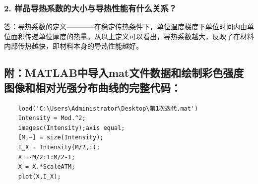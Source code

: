 \documentclass[12pt,a4paper,UTF8]{ctexart}
\begin{document}
	\subsubsection*{2. 样品导热系数的大小与导热性能有什么关系？}
	答：导热系数的定义————在稳定传热条件下，单位温度梯度下单位时间内由单位面积传递单位厚度的热量。从以上定义可以看出，导热系数越大，反映了在材料内部传热越快，即材料本身的导热性能越好。

\newpage %
\subsection*{附：MATLAB中导入mat文件数据和绘制彩色强度图像和相对光强分布曲线的完整代码：}

	\begin{lstlisting}
	load('C:\Users\Administrator\Desktop\第1次迭代.mat')
	Intensity = Mod.^2;
	imagesc(Intensity);axis equal;  
	[M,~] = size(Intensity);
	I_X = Intensity(M/2,:);
	X =-M/2:1:M/2-1;
	X = X.*ScaleATM;
	plot(X,I_X);
	\end{lstlisting}
\end{document}
